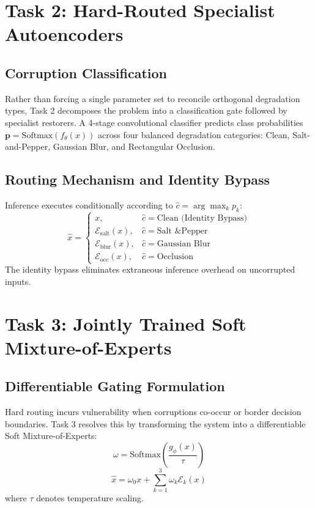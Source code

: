 \documentclass[conference]{IEEEtran}
\begin{document}
\section{Task 2: Hard-Routed Specialist Autoencoders}
\subsection{Corruption Classification}
Rather than forcing a single parameter set to reconcile orthogonal degradation types, Task 2 decomposes the problem into a classification gate followed by specialist restorers. A 4-stage convolutional classifier predicts class probabilities $\mathbf{p} = \text{Softmax}(f_\theta(x))$ across four balanced degradation categories: Clean, Salt-and-Pepper, Gaussian Blur, and Rectangular Occlusion.

\subsection{Routing Mechanism and Identity Bypass}
Inference executes conditionally according to $\hat{c} = \arg\max_k p_k$:
\begin{equation}
\hat{x} = 
\begin{cases} 
x, & \hat{c} = \text{Clean (Identity Bypass)} \\
\mathcal{E}_{\text{salt}}(x), & \hat{c} = \text{Salt \& Pepper} \\
\mathcal{E}_{\text{blur}}(x), & \hat{c} = \text{Gaussian Blur} \\
\mathcal{E}_{\text{occ}}(x), & \hat{c} = \text{Occlusion}
\end{cases}
\end{equation}
The identity bypass eliminates extraneous inference overhead on uncorrupted inputs.

\section{Task 3: Jointly Trained Soft Mixture-of-Experts}
\subsection{Differentiable Gating Formulation}
Hard routing incurs vulnerability when corruptions co-occur or border decision boundaries. Task 3 resolves this by transforming the system into a differentiable Soft Mixture-of-Experts:
\begin{equation}
\omega = \text{Softmax}\left(\frac{g_\phi(x)}{\tau}\right)
\end{equation}
\begin{equation}
\hat{x} = \omega_0 x + \sum_{k=1}^3 \omega_k \mathcal{E}_k(x)
\end{equation}
where $\tau$ denotes temperature scaling. 
\end{document}
